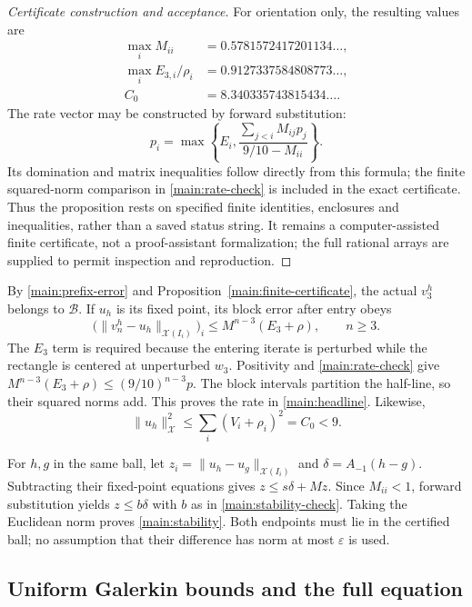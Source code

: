 \begin{proof}[Certificate construction and acceptance]
For orientation only, the resulting values are
\begin{align*}
 \max_i M_{ii}&=0.5781572417201134\ldots,\\
 \max_i E_{3,i}/\rho_i&=0.9127337584808773\ldots,\\
 C_0&=8.340335743815434\ldots.
\end{align*}
The rate vector may be constructed by forward substitution:
\[
 p_i=\max\left\{E_i,
       \frac{\sum_{j<i}M_{ij}p_j}{9/10-M_{ii}}\right\}.
\]
Its domination and matrix inequalities follow directly from this formula;
the finite squared-norm comparison in \eqref{main:rate-check} is included
in the exact certificate. Thus the proposition rests on specified finite
identities, enclosures and inequalities, rather than a saved status string.
It remains a computer-assisted finite certificate, not a proof-assistant
formalization; the full rational arrays are supplied to permit inspection
and reproduction.
\end{proof}

By \eqref{main:prefix-error} and Proposition~\ref{main:finite-certificate},
the actual $v_3^h$ belongs to $\mathcal B$. If $u_h$ is its fixed point,
its block error after entry obeys
\begin{equation}
 \big(\|v_n^h-u_h\|_{\mathcal X(I_i)}\big)_i
 \le M^{n-3}(E_3+\rho),\qquad n\ge3.\label{main:vector-rate}
\end{equation}
The $E_3$ term is required because the entering iterate is perturbed while
the rectangle is centered at unperturbed $w_3$. Positivity and
\eqref{main:rate-check} give $M^{n-3}(E_3+\rho)\le(9/10)^{n-3}p$.
The block intervals partition the half-line, so their squared norms add.
This proves the rate in \eqref{main:headline}. Likewise,
\begin{equation}
 \|u_h\|_{\mathcal X}^2\le\sum_i(V_i+\rho_i)^2=C_0<9.
 \label{main:solution-budget}
\end{equation}

For $h,g$ in the same ball, let
$z_i=\|u_h-u_g\|_{\mathcal X(I_i)}$ and $\delta=A_{-1}(h-g)$.
Subtracting their fixed-point equations gives $z\le s\delta+Mz$.
Since $M_{ii}<1$, forward substitution yields $z\le b\delta$ with
$b$ as in \eqref{main:stability-check}. Taking the Euclidean norm proves
\eqref{main:stability}. Both endpoints must lie in the certified ball;
no assumption that their difference has norm at most $\varepsilon$ is used.

\subsection{Uniform Galerkin bounds and the full equation}
\label{main:pde}

